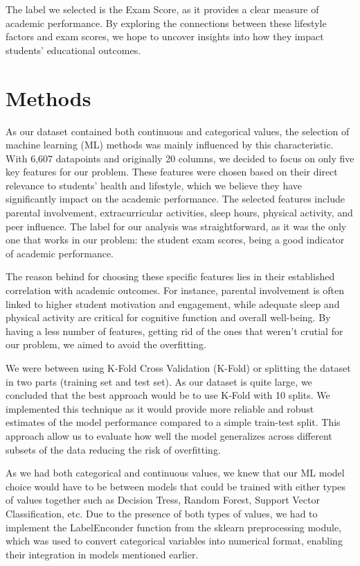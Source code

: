 \documentclass{article}
\begin{document}
The label we selected is the Exam Score, as it provides a clear measure of academic performance. By exploring the connections between these lifestyle factors and exam scores, we hope to uncover insights into how they impact students’ educational outcomes.

\section{Methods}

\quad As our dataset contained both continuous and categorical values, the selection of machine learning (ML) methods was mainly influenced by this characteristic. With 6,607 datapoints and originally 20 columns, we decided to focus on only five key features for our problem. These features were chosen based on their direct relevance to students' health and lifestyle, which we believe they have significantly impact on the academic performance. The selected features include parental involvement, extracurricular activities, sleep hours, physical activity, and peer influence. The label for our analysis was straightforward, as it was the only one that works in our problem: the student exam scores, being a good indicator of academic performance.

The reason behind for choosing these specific features lies in their established correlation with academic outcomes. For instance, parental involvement is often linked to higher student motivation and engagement, while adequate sleep and physical activity are critical for cognitive function and overall well-being. By having a less number of features, getting rid of the ones that weren’t crutial for our problem, we aimed to avoid the overfitting. 

We were between using K-Fold Cross Validation (K-Fold) or splitting the dataset in two parts (training set and test set). As our dataset is quite large, we concluded that the best approach  would be to use K-Fold with 10 splits. We implemented this technique as it would provide more reliable and robust estimates of the model performance compared to a simple train-test split. This approach allow us to evaluate how well the model generalizes across different subsets of the data reducing the risk of overfitting. \cite{K-fold_Cross-Validation}

As we had both categorical and continuous values, we knew that our ML model choice would have to be between models that could be trained with either types of values together such as Decision Tress, Random Forest, Support Vector Classification, etc. Due to the presence of both types of values, we had to implement the LabelEnconder function from the sklearn preprocessing module, which was used to convert categorical variables into numerical format, enabling their integration in models mentioned earlier.\cite{ML_Model}
\end{document}
